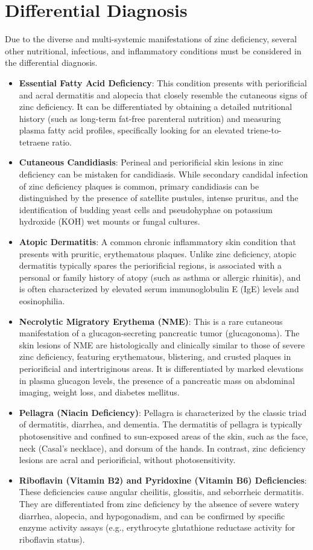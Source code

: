 \section*{Differential Diagnosis}
Due to the diverse and multi-systemic manifestations of zinc deficiency, several other nutritional, infectious, and inflammatory conditions must be considered in the differential diagnosis.

\begin{itemize}
    \item \textbf{Essential Fatty Acid Deficiency}: This condition presents with periorificial and acral dermatitis and alopecia that closely resemble the cutaneous signs of zinc deficiency. It can be differentiated by obtaining a detailed nutritional history (such as long-term fat-free parenteral nutrition) and measuring plasma fatty acid profiles, specifically looking for an elevated triene-to-tetraene ratio.
    \item \textbf{Cutaneous Candidiasis}: Perineal and periorificial skin lesions in zinc deficiency can be mistaken for candidiasis. While secondary candidal infection of zinc deficiency plaques is common, primary candidiasis can be distinguished by the presence of satellite pustules, intense pruritus, and the identification of budding yeast cells and pseudohyphae on potassium hydroxide (KOH) wet mounts or fungal cultures.
    \item \textbf{Atopic Dermatitis}: A common chronic inflammatory skin condition that presents with pruritic, erythematous plaques. Unlike zinc deficiency, atopic dermatitis typically spares the periorificial regions, is associated with a personal or family history of atopy (such as asthma or allergic rhinitis), and is often characterized by elevated serum immunoglobulin E (IgE) levels and eosinophilia.
    \item \textbf{Necrolytic Migratory Erythema (NME)}: This is a rare cutaneous manifestation of a glucagon-secreting pancreatic tumor (glucagonoma). The skin lesions of NME are histologically and clinically similar to those of severe zinc deficiency, featuring erythematous, blistering, and crusted plaques in periorificial and intertriginous areas. It is differentiated by marked elevations in plasma glucagon levels, the presence of a pancreatic mass on abdominal imaging, weight loss, and diabetes mellitus.
    \item \textbf{Pellagra (Niacin Deficiency)}: Pellagra is characterized by the classic triad of dermatitis, diarrhea, and dementia. The dermatitis of pellagra is typically photosensitive and confined to sun-exposed areas of the skin, such as the face, neck (Casal's necklace), and dorsum of the hands. In contrast, zinc deficiency lesions are acral and periorificial, without photosensitivity.
    \item \textbf{Riboflavin (Vitamin B2) and Pyridoxine (Vitamin B6) Deficiencies}: These deficiencies cause angular cheilitis, glossitis, and seborrheic dermatitis. They are differentiated from zinc deficiency by the absence of severe watery diarrhea, alopecia, and hypogonadism, and can be confirmed by specific enzyme activity assays (e.g., erythrocyte glutathione reductase activity for riboflavin status).
\end{itemize}


